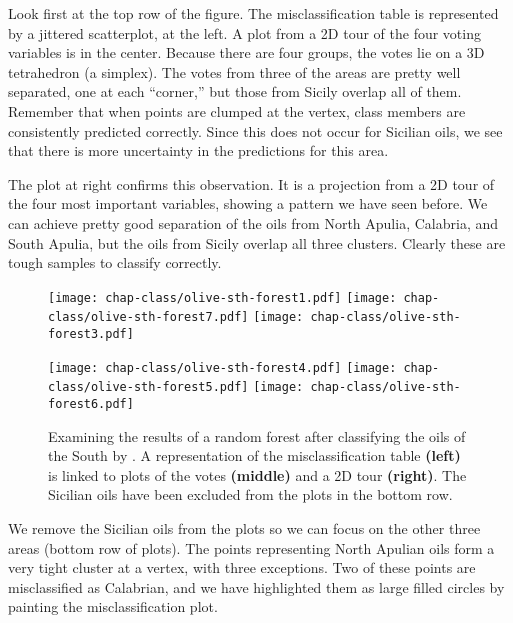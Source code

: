 
\noindent Look first at the top row of the figure.  The
misclassification table is represented by a jittered scatterplot, at
the left.  A plot from a 2D tour  of the four
voting variables is in the center.  Because there are four groups, the
votes lie on a 3D tetrahedron (a simplex).  The votes from three of
the areas are pretty well separated, one at each ``corner,'' but those
from Sicily overlap all of them.  Remember that when points are
clumped at the vertex, class members are consistently predicted
correctly.  Since this does not occur for Sicilian oils, we see that
there is more uncertainty in the predictions for this area.

The plot at right confirms this observation. It is a projection from a
2D tour  of the four most important variables,
showing a pattern we have seen before.  We can achieve pretty good
separation of the oils from North Apulia, Calabria, and South Apulia,
but the oils from Sicily overlap all three clusters.  Clearly these
are tough samples to classify correctly.

\begin{figure*}[htbp]
\centerline{
  {\texttt{[image: chap-class/olive-sth-forest1.pdf]}}
  {\texttt{[image: chap-class/olive-sth-forest7.pdf]}}
  {\texttt{[image: chap-class/olive-sth-forest3.pdf]}}}
\smallskip
\centerline{
  {\texttt{[image: chap-class/olive-sth-forest4.pdf]}}
  {\texttt{[image: chap-class/olive-sth-forest5.pdf]}}
  {\texttt{[image: chap-class/olive-sth-forest6.pdf]}}}
\caption[Examining the results of a random forest after classifying
the oils of the South]{Examining the results of a random forest after
classifying the oils of the South by .  A representation of
the misclassification table {\bf (left)} is linked to plots of the
votes {\bf (middle)} and a 2D tour {\bf (right)}.  The Sicilian oils
have been excluded from the plots in the bottom row.}
\label{olive-forest2}
\end{figure*}

We remove the Sicilian oils from the plots so we can focus on the
other three areas (bottom row of plots). The points representing North
Apulian oils form a very tight cluster at a vertex, with three
exceptions. Two of these points are misclassified as Calabrian, and we
have highlighted them as large filled circles by painting the
misclassification plot.

